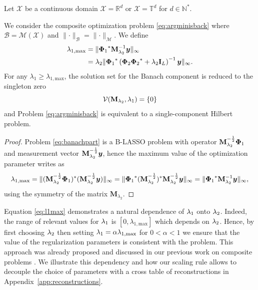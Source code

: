 \documentclass[12pt]{article}
\begin{document}
    \begin{proposition}
    \label{prop:lmax}
    Let $\mathcal{X}$ be a continuous domain $\mathcal{X}=\mathbb{R}^d$ or $\mathcal{X}=\mathbb{T}^d$ for $d \in \mathbb{N}^*$.

    We consider the composite optimization problem \eqref{eq:argminisback} where $\mathcal{B} = \mathcal{M}(\mathcal{X})$ and $\lVert \cdot \rVert_\mathcal{B} = \lVert \cdot \rVert_\mathcal{M}$. We define
    \begin{equation}
        \label{eq:l1max}
        \begin{split}
        \lambda_{1, \mathrm{max}} &= \lVert {\bm{\Phi}_1}^* \mathbf{M}_{\lambda_2}^{-1} \bm{y} \rVert_\infty \\
                & = \lambda_2 \lVert {\bm{\Phi}_1}^* \left( {\bm{\Phi}_2} {\bm{\Phi}_2}^* + \lambda_2 \mathbf{I}_L \right)^{-1} \bm{y} \rVert_\infty.
        \end{split}
    \end{equation}
    For any $\lambda_1 \geq \lambda_{1, \mathrm{max}}$, the solution set for the Banach component is reduced to the singleton zero 
    $$\mathcal{V}(\mathbf{M}_{\lambda_{2}}, \lambda_{1}) = \left\{ 0 \right\}$$
    and Problem \eqref{eq:argminisback} is equivalent to a single-component Hilbert problem.
    \end{proposition}

    \begin{proof}
        Problem \eqref{eq:banachpart} is a B-LASSO problem with operator $\mathbf{M}_{\lambda_{2}}^{-\frac{1}{2}} {\bm{\Phi}_1}$ and measurement vector $\mathbf{M}_{\lambda_{2}}^{-\frac{1}{2}}\bm{y}$, hence the maximum value of the optimization parameter writes as
        \begin{equation*}
            \lambda_{1, \mathrm{max}} = \lVert (\mathbf{M}_{\lambda_{2}}^{-\frac{1}{2}} {\bm{\Phi}_1})^*  (\mathbf{M}_{\lambda_{2}}^{-\frac{1}{2}} \bm{y}) \rVert_\infty = \lVert {\bm{\Phi}_1}^* (\mathbf{M}_{\lambda_{2}}^{-\frac{1}{2}})^* \mathbf{M}_{\lambda_{2}}^{-\frac{1}{2}} \bm{y} \rVert_\infty = \lVert {\bm{\Phi}_1}^* \mathbf{M}_{\lambda_2}^{-1} \bm{y} \rVert_\infty,
        \end{equation*}
        using the symmetry of the matrix $\mathbf{M}_{\lambda_2}$.
    \end{proof}

    Equation \eqref{eq:l1max} demonstrates a natural dependence of $\lambda_{1}$ onto $\lambda_{2}$. Indeed, the range of relevant values for $\lambda_{1}$ is $[0, \lambda_{1, \mathrm{max}}]$ which depends on $\lambda_{2}$. Hence, by first choosing $\lambda_{2}$ then setting $\lambda_{1} = \alpha \lambda_{1, \mathrm{max}}$ for $0 < \alpha < 1$ we ensure that the value of the regularization parameters is consistent with the problem. This approach was already proposed and discussed in our previous work on composite problems \cite{jarret2024decoupled}. We illustrate this dependency and how our scaling rule allows to decouple the choice of parameters with a cross table of reconstructions in Appendix~\ref{app:reconstructions}.
\end{document}
